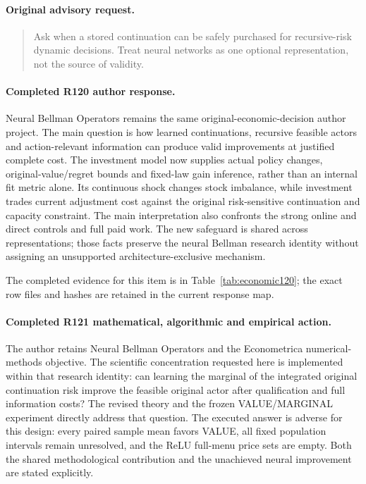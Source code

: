 \paragraph{Original advisory request.}
\begin{quote}
Ask when a stored continuation can be safely purchased for recursive-risk dynamic decisions. Treat neural networks as one optional representation, not the source of validity.
\end{quote}

\paragraph{Completed R120 author response.}
Neural Bellman Operators remains the same original-economic-decision author project. The main question is how learned continuations, recursive feasible actors and action-relevant information can produce valid improvements at justified complete cost. The investment model now supplies actual policy changes, original-value/regret bounds and fixed-law gain inference, rather than an internal fit metric alone. Its continuous shock changes stock imbalance, while investment trades current adjustment cost against the original risk-sensitive continuation and capacity constraint. The main interpretation also confronts the strong online and direct controls and full paid work. The new safeguard is shared across representations; those facts preserve the neural Bellman research identity without assigning an unsupported architecture-exclusive mechanism.

The completed evidence for this item is in Table~\ref{tab:economic120}; the exact row files and hashes are retained in the current response map.

\paragraph{Completed R121 mathematical, algorithmic and empirical action.}
The author retains Neural Bellman Operators and the Econometrica numerical-methods objective. The scientific concentration requested here is implemented within that research identity: can learning the marginal of the integrated original continuation risk improve the feasible original actor after qualification and full information costs? The revised theory and the frozen VALUE/MARGINAL experiment directly address that question. The executed answer is adverse for this design: every paired sample mean favors VALUE, all fixed population intervals remain unresolved, and the ReLU full-menu price sets are empty. Both the shared methodological contribution and the unachieved neural improvement are stated explicitly.

